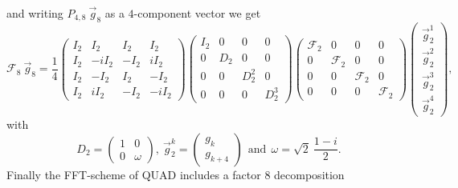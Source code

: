 and writing $P_{4,8} \ \vec{g}_{8}$ as a $4$-component vector we get
\begin{equation} \label{eq_F8ex01}
 \mathcal{F}_{8} \ \vec{g}_{8}
  = 
 \frac{1}{4}
  \left(
   \begin{array}{rrrr}
    I_{2} & I_{2} & I_{2} & I_{2} 
    \\
    I_{2} & -iI_{2} & -I_{2} & iI_{2} 
    \\
    I_{2} & -I_{2} & I_{2} & -I_{2} 
    \\
    I_{2} & iI_{2} & -I_{2} & -iI_{2}
   \end{array}
  \right) 
  \left(
   \begin{array}{cccc}
    I_{2} &  0    &  0        &  0
    \\
      0   & D_{2} &  0        &  0
    \\
      0   &   0   & D^{2}_{2} &  0
    \\
      0   &   0   &   0       & D^{3}_{2}
   \end{array}
  \right)
  \left(
   \begin{array}{cccc}
    \mathcal{F}_{2} &  0  &   0  &  0
    \\
        0   & \mathcal{F}_{2} & 0 & 0
    \\
        0   &   0   & \mathcal{F}_{2} & 0
    \\
        0   &   0     &  0  &  \mathcal{F}_{2}
   \end{array}
  \right)
  \left(
   \begin{array}{c}
    \vec{g}^{1}_{2}
     \\
    \vec{g}^{2}_{2}
     \\
    \vec{g}^{3}_{2}
     \\
    \vec{g}^{4}_{2}
   \end{array}
  \right),
\end{equation}
with
\begin{equation} \label{eq_F8ex02}
 D_{2} 
  = 
 \left(
  \begin{array}{cc}
    1 & 0
    \\
    0 & \omega
  \end{array}
 \right)
 , \ 
 \vec{g}^{k}_{2} 
  =
 \left(
  \begin{array}{c}
   g_{k}
   \\
   g_{k+4}
  \end{array}
 \right)
 \ \ \mbox{and} \ \
 \omega 
  =
 \sqrt{2} \  \frac{1 - i}{2}.
\end{equation}
Finally the FFT-scheme of QUAD includes a factor $8$ decomposition
